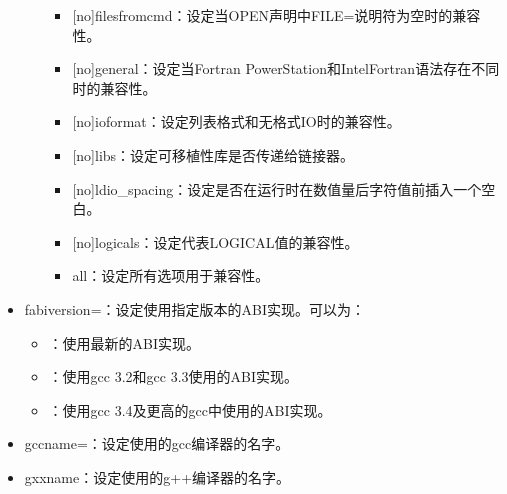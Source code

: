 \documentclass[a4paper,12pt,english]{sphinxmanual}
\begin{document}
\begin{itemize}
\begin{itemize}
\begin{itemize}
\item {} 
\sphinxAtStartPar
{[}no{]}filesfromcmd：设定当OPEN声明中FILE=说明符为空时的兼容性。

\item {} 
\sphinxAtStartPar
{[}no{]}general：设定当Fortran PowerStation和IntelFortran语法存在不同时的兼容性。

\item {} 
\sphinxAtStartPar
{[}no{]}ioformat：设定列表格式和无格式IO时的兼容性。

\item {} 
\sphinxAtStartPar
{[}no{]}libs：设定可移植性库是否传递给链接器。

\item {} 
\sphinxAtStartPar
{[}no{]}ldio\_spacing：设定是否在运行时在数值量后字符值前插入一个空白。

\item {} 
\sphinxAtStartPar
{[}no{]}logicals：设定代表LOGICAL值的兼容性。

\item {} 
\sphinxAtStartPar
all：设定所有选项用于兼容性。

\end{itemize}

\end{itemize}

\item {} 
\sphinxAtStartPar
\sphinxhyphen{}fabi\sphinxhyphen{}version=：设定使用指定版本的ABI实现。可以为：
\begin{itemize}
\item {} 
：使用最新的ABI实现。

\item {} 
：使用gcc 3.2和gcc 3.3使用的ABI实现。

\item {} 
：使用gcc 3.4及更高的gcc中使用的ABI实现。

\end{itemize}

\item {} 
\sphinxAtStartPar
\sphinxhyphen{}gcc\sphinxhyphen{}name=：设定使用的gcc编译器的名字。

\item {} 
\sphinxAtStartPar
\sphinxhyphen{}gxx\sphinxhyphen{}name：设定使用的g++编译器的名字。

\end{itemize}
\end{document}

